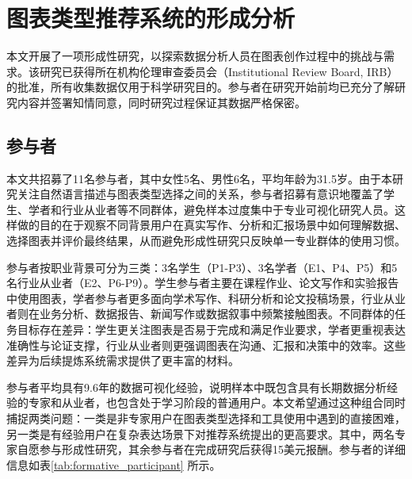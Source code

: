 \section{图表类型推荐系统的形成分析}

本文开展了一项形成性研究，以探索数据分析人员在图表创作过程中的挑战与需求。该研究已获得所在机构伦理审查委员会（Institutional Review Board, IRB）的批准，所有收集数据仅用于科学研究目的。参与者在研究开始前均已充分了解研究内容并签署知情同意，同时研究过程保证其数据严格保密。

\subsection{参与者}

本文共招募了11名参与者，其中女性5名、男性6名，平均年龄为31.5岁。由于本研究关注自然语言描述与图表类型选择之间的关系，参与者招募有意识地覆盖了学生、学者和行业从业者等不同群体，避免样本过度集中于专业可视化研究人员。这样做的目的在于观察不同背景用户在真实写作、分析和汇报场景中如何理解数据、选择图表并评价最终结果，从而避免形成性研究只反映单一专业群体的使用习惯。

参与者按职业背景可分为三类：3名学生（P1-P3）、3名学者（E1、P4、P5）和5名行业从业者（E2、P6-P9）。学生参与者主要在课程作业、论文写作和实验报告中使用图表，学者参与者更多面向学术写作、科研分析和论文投稿场景，行业从业者则在业务分析、数据报告、新闻写作或数据叙事中频繁接触图表。不同群体的任务目标存在差异：学生更关注图表是否易于完成和满足作业要求，学者更重视表达准确性与论证支撑，行业从业者则更强调图表在沟通、汇报和决策中的效率。这些差异为后续提炼系统需求提供了更丰富的材料。

参与者平均具有9.6年的数据可视化经验，说明样本中既包含具有长期数据分析经验的专家和从业者，也包含处于学习阶段的普通用户。本文希望通过这种组合同时捕捉两类问题：一类是非专家用户在图表类型选择和工具使用中遇到的直接困难，另一类是有经验用户在复杂表达场景下对推荐系统提出的更高要求。其中，两名专家自愿参与形成性研究，其余参与者在完成研究后获得15美元报酬。参与者的详细信息如表\ref{tab:formative_participant} 所示。

